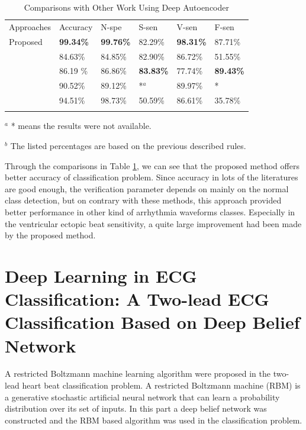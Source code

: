 \documentclass[graybox]{svmult}
\begin{document}
\begin{table}
\caption{Comparisons with Other Work Using Deep Autoencoder}
\label{tab:6}       %
%
%
\begin{tabular}{p{2.6cm}p{1.7cm}p{1.7cm}p{1.7cm}p{1.7cm}p{1.6cm}}
\hline\noalign{\smallskip}
 Approaches     &  Accuracy & N-spe & S-sen & V-sen & F-sen  \\
\noalign{\smallskip}\svhline\noalign{\smallskip}
Proposed             &  \textbf{99.34\%}  & \textbf{99.76\%} &  82.29\% & \textbf{98.31\%} & 87.71\% \\
 \citet{mar2011optimization}        &  84.63\%  & 84.85\% & 82.90\%  & 86.72\% & 51.55\% \\
 \citet{chaza}   &  86.19 \% & 86.86\% & \textbf{83.83\%}  & 77.74\% & \textbf{89.43\%} \\
 \citet{melgan} &   90.52\%  & 89.12\% & *$^a$    & 89.97\% & * \\
  \citet{jiang2007block}   &  94.51\%  & 98.73\% & 50.59\%  & 86.61\% & 35.78\% \\
\noalign{\smallskip}\hline\noalign{\smallskip}
\end{tabular}

$^a$ * means the results were not available.

$^b$ The listed percentages are based on the previous described rules.
\end{table}

Through the comparisons in Table \ref{tab:6}, we can see that the proposed method offers better accuracy of classification problem. Since accuracy in lots of the literatures are good enough, the verification parameter depends on mainly on the normal class detection, but on contrary with these methods, this approach provided better performance in other kind of arrhythmia waveforms classes. Especially in the ventricular ectopic beat sensitivity, a quite large improvement had been made by the proposed method.




\section{Deep Learning in ECG Classification: A Two-lead ECG Classification Based on Deep Belief Network}
A restricted Boltzmann machine learning algorithm were proposed in the two-lead heart beat classification problem. A restricted Boltzmann machine (RBM) is a generative stochastic artificial neural network that can learn a probability distribution over its set of inputs. In this part a deep belief network was constructed and the RBM based algorithm was used in the classification problem. 
\end{document}
